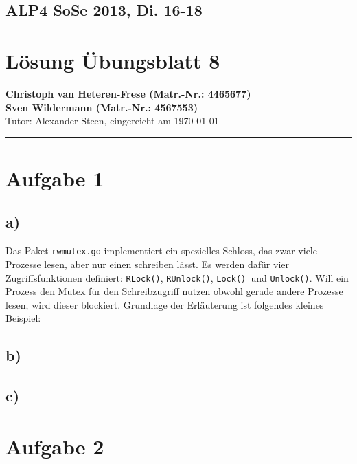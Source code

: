\documentclass[11pt,a4paper,DIV=10,]{scrartcl}
\begin{document}
\subsection*{ALP4 SoSe 2013, Di. 16-18}
\section*{Lösung Übungsblatt 8}
\textbf{Christoph van Heteren-Frese (Matr.-Nr.: 4465677)} \\ \textbf{Sven Wildermann (Matr.-Nr.: 4567553)}\\
Tutor: Alexander Steen, eingereicht am \today\\
\hrule
\section*{Aufgabe 1}
\subsection*{a)}
Das Paket \texttt{rwmutex.go} implementiert ein spezielles Schloss, das zwar viele Prozesse lesen, aber nur einen schreiben lässt. Es werden dafür vier Zugriffsfunktionen definiert: \texttt{RLock()}, \texttt{RUnlock()}, \texttt{Lock() }und \texttt{Unlock()}. Will ein Prozess den Mutex für den Schreibzugriff nutzen obwohl gerade andere Prozesse lesen, wird dieser blockiert.
Grundlage der Erläuterung ist folgendes kleines Beispiel:

\subsection*{b)}
\subsection*{c)}
\section*{Aufgabe 2}
\end{document}
